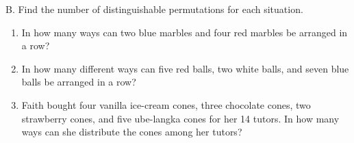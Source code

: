 B. Find the number of distinguishable permutations for each situation. 

\begin{enumerate}[label = \arabic*. ]
\item In how many ways can two blue marbles and four red marbles be arranged in a row?
\item In how many different ways can five red balls, two white balls,  and seven blue balls be arranged in a row?
\item Faith bought four vanilla ice-cream cones, three chocolate cones, two strawberry cones, and
five ube-langka cones for her 14 tutors. In how many ways can she distribute the cones among her tutors?

\end{enumerate}  